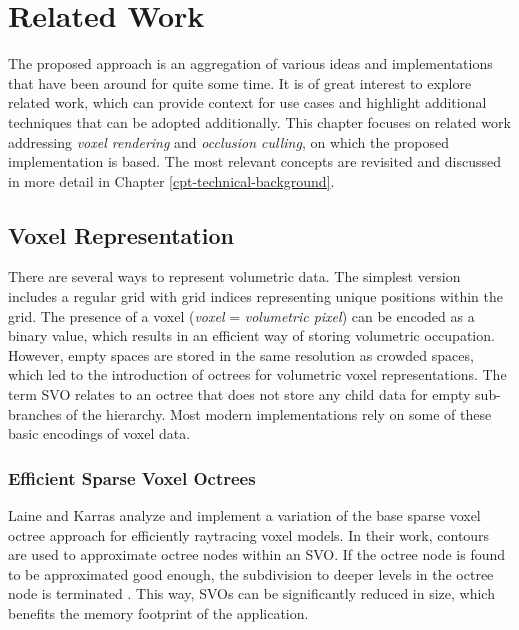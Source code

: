 \chapter{Related Work} \label{cpt-related-work}

The proposed approach is an aggregation of various ideas and implementations that have been 
around for quite some time. It is of great interest to explore related work, which can provide 
context for use cases and highlight additional techniques that can be adopted additionally. 
This chapter focuses on related work addressing \emph{voxel rendering} and \emph{occlusion culling}, 
on which the proposed implementation is based. The most relevant concepts 
are revisited and discussed in more detail in Chapter \ref{cpt-technical-background}. 


\section{Voxel Representation} \label{sec-voxel-representation}

There are several ways to represent volumetric data. The simplest version includes a regular 
grid with grid indices representing unique positions within the grid. The presence of a voxel 
(\emph{voxel} = \emph{volumetric pixel}) can be encoded as a binary value, which results in 
an efficient way of storing volumetric occupation. However, empty spaces are stored in the 
same resolution as crowded spaces, which led to the introduction of octrees for volumetric 
voxel representations. The term \ac{SVO} relates to an octree that does not store any child 
data for empty sub-branches of the hierarchy. Most modern implementations rely on some of 
these basic encodings of voxel data. 


\subsection*{Efficient Sparse Voxel Octrees}

Laine and Karras \cite{Laine2010} analyze and implement a variation of the base sparse voxel octree approach for 
efficiently raytracing voxel models. In their work, contours are used to approximate octree nodes within an \ac{SVO}. 
If the octree node is found to be approximated good enough, the subdivision to deeper levels in the octree node is 
terminated \cite{Kampe2013,Laine2010}. This way, \ac{SVO}s can be significantly reduced in size, which benefits 
the memory footprint of the application. \\

